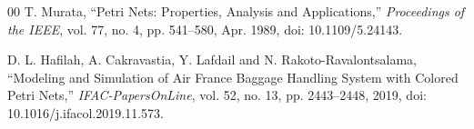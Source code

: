 \documentclass[conference]{IEEEtran}
\begin{document}
\begin{thebibliography}{00}
T. Murata, ``Petri Nets: Properties, Analysis and Applications,''
\textit{Proceedings of the IEEE}, vol. 77, no. 4, pp. 541--580,
Apr. 1989, doi: 10.1109/5.24143.

D. L. Hafilah, A. Cakravastia, Y. Lafdail and N. Rakoto-Ravalontsalama,
``Modeling and Simulation of Air France Baggage Handling System with Colored
Petri Nets,'' \textit{IFAC-PapersOnLine}, vol. 52, no. 13,
pp. 2443--2448, 2019, doi: 10.1016/j.ifacol.2019.11.573.

\end{thebibliography}
\end{document}
